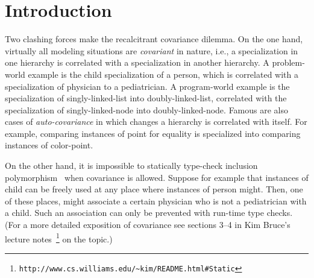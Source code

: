 \documentclass[11pt]{article}
\numberwithin{figure}{section}
\newcommand\CC{\Lang{\mbox{C++}}\xspace}
\newcommand\Lang[1]{\textsc{#1}}
\newcommand\Cls[1]{\textsf{#1}}
\begin{document}
\maketitle

\begin{abstract}
We present a programming technique for implementing
    type safe covariance in \CC{}.
In a sense, we implement most of Bruce's \emph{matching}
    approach to the covariance dilemma in \CC.
The appeal in our approach is that it relies on existing mechanisms,
    specifically templates, and does not require any
    modification to the existing language.
The practical value of the technique was demonstrated
    in its successful incorporation in a large software body.
We identify the ingredients of a programming language
    required for applying the technique, and discuss
    extensions to other languages.
\end{abstract}

\section{Introduction}
Two clashing forces make
    the recalcitrant covariance dilemma.
On the one hand, virtually all modeling situations
    are \emph{covariant} in nature, i.e., a specialization in
    one hierarchy
    is correlated with a specialization
    in another hierarchy.
A problem-world example is the \Cls{child} specialization of a
    \Cls{person}, which is correlated with a specialization
    of \Cls{physician} to a \Cls{pediatrician}.
A program-world example is the specialization of
    \Cls{singly-linked-list} into \Cls{doubly-linked-list},
    correlated with the specialization of \Cls{singly-linked-node}
    into \Cls{doubly-linked-node}.
Famous are also cases of \emph{auto-covariance} in which changes
    a hierarchy is correlated with itself.
For example, comparing instances of \Cls{point} for equality is specialized
    into comparing instances of \Cls{color-point}.

On the other hand, it is impossible to statically
    type-check inclusion polymorphism~\cite{Cardelli:Wegner:85}
    when covariance is allowed.
Suppose for example that instances of \Cls{child}
    can be freely used at any place where instances of \Cls{person}
    might.
Then, one of these places, might associate
    a certain \Cls{physician} who is not
    a \Cls{pediatrician} with a \Cls{child}.
Such an association can only be prevented with run-time
    type checks.
(For a more detailed exposition of covariance see sections 3--4 in Kim Bruce's
    lecture notes~\footnote{\texttt{http://www.cs.williams.edu/\textasciitilde kim/README.html\#Static}}
    on the topic.)
\end{document}
